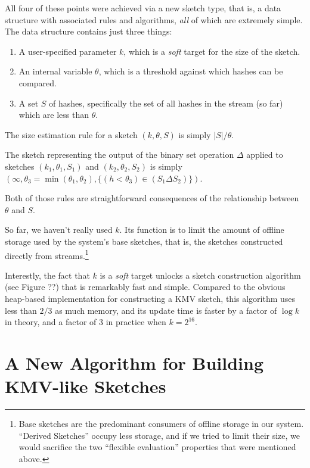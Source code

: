 \documentclass{sig-alternate}
\newenvironment{tighterenumerate}%
  {\begin{enumerate}%
    \setlength{\itemsep}{1pt}%
    \setlength{\parskip}{1pt}}%
  {\end{enumerate}}
\begin{document}
All four of these points were achieved via a new sketch type, that is,
a data structure with associated rules and algorithms, {\em all} of
which are extremely simple. The data structure contains just three
things:

\begin{tighterenumerate}
\item A user-specified parameter $k$, which is a {\em soft} target for the size of the sketch.
\item An internal variable $\theta$, which is a threshold against which hashes can be compared.
\item A set $S$ of hashes, specifically the set of all hashes in the stream (so far)
which are less than $\theta$.
\end{tighterenumerate}

The size estimation rule for a sketch $(k,\theta,S)$ is simply $|S|/\theta$. 

The sketch representing the output of the binary set operation
$\Delta$ applied to sketches $(k_1,\theta_1,S_1)$ and $(k_2,\theta_2,S_2)$ is simply
$(\infty,\theta_3=\min(\theta_1,\theta_2),\{(h < \theta_3)\in (S_1 \Delta S_2)\})$.

Both of those rules are straightforward consequences of the
relationship between $\theta$ and $S$. 


So far, we haven't really used $k$. Its function is to limit the amount
of offline storage used by the system's base sketches, that is, the
sketches constructed directly from streams.\footnote{Base sketches
are the predominant consumers of offline storage in our system.
``Derived Sketches'' occupy less storage, and if we tried to limit
their size, we would sacrifice the two ``flexible evaluation'' 
properties that were mentioned above.}

Interestly, the fact that $k$ is a {\em soft} target unlocks a sketch
construction algorithm (see Figure ??)  that is remarkably fast and
simple.  Compared to the obvious heap-based implementation for
constructing a KMV sketch, this algorithm uses less than $2/3$ as much
memory, and its update time is faster by a factor of $\log k$ in
theory, and a factor of $3$ in practice when $k=2^{16}$.



\section{A New Algorithm for Building KMV-like Sketches}
\end{document}
